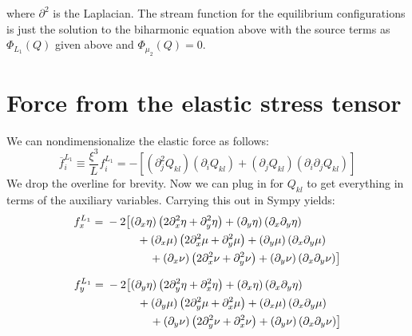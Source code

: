 \documentclass[reqno]{article}
\begin{document}
where $\partial^2$ is the Laplacian. The stream function for the equilibrium configurations is just the solution to the biharmonic equation above with the source terms as $\Phi_{L_1} (Q)$ given above and $\Phi_{\mu_2} (Q) = 0$. 

\section{Force from the elastic stress tensor}
We can nondimensionalize the elastic force as follows:
\begin{equation}
\overline{f}^{L_1}_i 
\equiv \frac{\xi^3}{L} f^{L_1}_i
= - \left[
\left( \partial_j^2 Q_{kl} \right)
\left( \partial_i Q_{kl} \right)
+ \left( \partial_j Q_{kl} \right)
\left( \partial_i \partial_j Q_{kl} \right)
\right]
\end{equation}
We drop the overline for brevity.
Now we can plug in for $Q_{kl}$ to get everything in terms of the auxiliary variables.
Carrying this out in Sympy yields:
\begin{equation}
\begin{split}
	f^{L_1}_x
	=
	\begin{multlined}[t]
	-2 \bigl[
	\left(\partial_x \eta \right) \left( 2 \partial_x^2 \eta + \partial_y^2 \eta \right)
	+ \left( \partial_y \eta \right) \left( \partial_x \partial_y \eta \right) \\
	\hspace{0.5cm}+ \left( \partial_x \mu \right) \left( 2 \partial_x^2 \mu + \partial_y^2 \mu \right)
	+ \left( \partial_y \mu \right) \left( \partial_x \partial_y \mu \right) \\
	\hspace{1cm}+ \left( \partial_x \nu \right) \left( 2 \partial_x^2 \nu + \partial_y^2 \nu \right)
	+ \left( \partial_y \nu \right) \left( \partial_x \partial_y \nu \right)
	\bigr]
	\end{multlined}
\end{split}
\end{equation}

\begin{equation}
	f^{L_1}_y
	=
	\begin{multlined}[t]
	-2 \bigl[
	\left( \partial_y \eta \right) \left( 2 \partial_y^2 \eta + \partial_x^2 \eta \right)
	+ \left( \partial_x \eta \right) \left( \partial_x \partial_y \eta \right) \\
	\hspace{0.5cm}+ \left( \partial_y \mu \right) \left( 2\partial_y^2 \mu + \partial_x^2 \mu \right)
	+ \left( \partial_x \mu \right) \left( \partial_x \partial_y \mu \right)  \\
	\hspace{1cm}+ \left( \partial_y \nu \right) \left( 2\partial_y^2 \nu + \partial_x^2 \nu \right)
	+ \left( \partial_y \nu \right) \left( \partial_x \partial_y \nu \right)
	\bigr]
	\end{multlined}
\end{equation}
\end{document}
